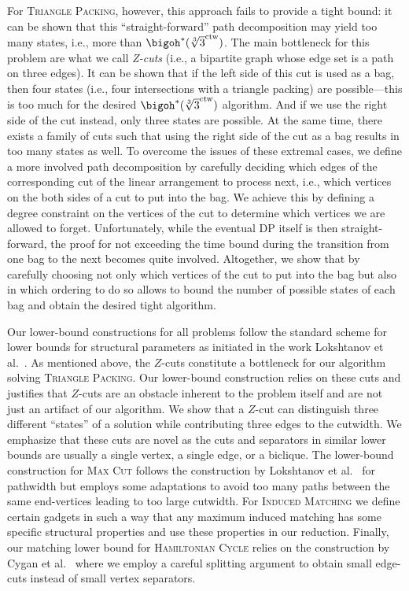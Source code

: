 \documentclass[a4paper,UKenglish,cleveref, autoref, thm-restate]{lipics-v2021}
\begin{document}
For \textsc{Triangle Packing}, however, this approach fails to provide a tight bound: it can be shown that this ``straight-forward'' path decomposition may yield too many states, i.e., more than $\bigoh^*(\sqrt[3]{3}^{\operatorname{ctw}})$.
The main bottleneck for this problem are what we call \emph{Z-cuts} 
(i.e., a bipartite graph whose edge set is a path on three edges).
It can be shown that if the left side of this cut is used as a bag, then four states (i.e., four intersections with a triangle packing) are possible---this is too much for the desired $\bigoh^*(\sqrt[3]{3}^{\operatorname{ctw}})$ algorithm.
And if we use the right side of the cut instead, only three states are possible.
At the same time, there exists a family of cuts such that using the right side of the cut as a bag results in too many states as well. 
To overcome the issues of these extremal cases, we define a more involved path decomposition by carefully deciding which edges of the corresponding cut of the linear arrangement to process next, i.e., which vertices on the both sides of a cut to put into the bag. We achieve this by defining a degree constraint on the vertices of the cut to determine which vertices we are allowed to forget. 
Unfortunately, while the eventual DP itself is then straight-forward, the proof for not exceeding the time bound during the transition from one bag to the next becomes quite involved.
Altogether, we show that by carefully choosing not only which vertices of the cut to put into the bag but also in which ordering to do so allows to bound the number of possible states of each bag and obtain the desired tight algorithm.

Our lower-bound constructions for all problems follow the standard scheme for lower bounds for structural parameters as initiated in the work Lokshtanov et al.~\cite{DBLP:journals/talg/LokshtanovMS18}. 
As mentioned above, the $Z$-cuts constitute a bottleneck for our algorithm solving \textsc{Triangle Packing}. 
Our lower-bound construction relies on these cuts and justifies that $Z$-cuts are an obstacle inherent to the problem itself and are not just an artifact of our algorithm.
We show that a $Z$-cut can distinguish three different ``states'' of a solution while contributing three edges to the cutwidth. 
We emphasize that these cuts are novel as the cuts and separators in similar lower bounds 
are usually a single vertex, a single edge, or a biclique. 
The lower-bound construction for \textsc{Max Cut} follows the construction by Lokshtanov et al.~\cite{DBLP:journals/talg/LokshtanovMS18} for pathwidth but employs some adaptations to avoid too many paths between the same end-vertices leading to too large cutwidth.
For \textsc{Induced Matching} 
we define certain gadgets in such a way that any maximum induced matching has some specific structural properties and use these properties in our reduction.
Finally, our matching lower bound for \textsc{Hamiltonian Cycle} relies on the construction by Cygan et al.~\cite{DBLP:journals/jacm/CyganKN18} where we employ a careful splitting argument to obtain small edge-cuts instead of small vertex separators.
\end{document}
